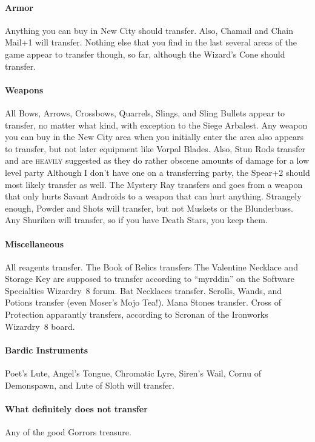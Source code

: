 \documentclass[11pt]{report}
\let\oldparagraph\paragraph
\renewcommand{\paragraph}[1]{\oldparagraph{#1}\mbox{}\nopagebreak}
\newcommand{\indexPlace}[1]{\index{#1}}
\newcommand{\place}[1]{#1\indexPlace{#1}}
\newcommand\textlcsc[1]{\texorpdfstring{\textsc{\MakeLowercase{#1}}}{#1}}
\begin{document}
\paragraph{Armor} Anything you can buy in \place{New City} should transfer.
Also, Chamail and Chain Mail+1 will transfer.  Nothing else that you find in
the last several areas of the game appear to transfer though, so far,
although the Wizard's Cone should transfer.

\paragraph{Weapons} All Bows, Arrows, Crossbows, Quarrels, Slings, and Sling
Bullets appear to transfer, no matter what kind, with exception to the Siege
Arbalest.  Any weapon you can buy in the \place{New City} area when you
initially enter the area also appears to transfer, but not later equipment
like Vorpal Blades.  Also, Stun Rods transfer and are \textlcsc{HEAVILY}
suggested as they do rather obscene amounts of damage for a low level party
Although I don't have one on a transferring party, the Spear+2 should most
likely transfer as well.  The Mystery Ray transfers and goes from a weapon
that only hurts Savant Androids to a weapon that can hurt anything.
Strangely enough, Powder and Shots will transfer, but not Muskets or the
Blunderbuss.  Any Shuriken will transfer, so if you have Death Stars, you
keep them.

\paragraph{Miscellaneous} All reagents transfer.  The Book of Relics
transfers The Valentine Necklace and Storage Key are supposed to transfer
according to “myrddin” on the Software Specialties Wizardry~8 forum.  Bat
Necklaces transfer.  Scrolls, Wands, and Potions transfer (even Moser's Mojo
Tea!).  Mana Stones transfer.  Cross of Protection apparantly transfers,
according to Scronan of the Ironworks Wizardry~8 board.

\paragraph{Bardic Instruments} Poet's Lute, Angel's Tongue, Chromatic Lyre,
Siren's Wail, Cornu of Demonspawn, and Lute of Sloth will transfer.

\paragraph{What definitely does not transfer} Any of the good Gorrors
treasure.
\end{document}
